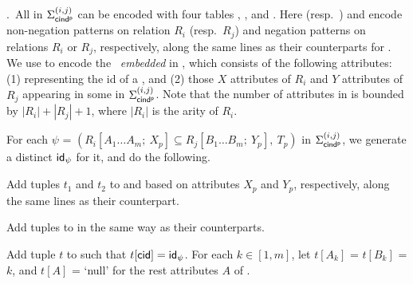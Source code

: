 .~All \pCINDs in $\Sigma_{{\mathsf{cind^p}}}^{(i,j)}$
can be encoded with four tables
\Enc{}, ,  and \Enc{\ne}.
Here  (resp.~) and \Enc{\ne} encode non-negation
patterns on relation $R_i$ (resp.~$R_j$)
and negation patterns on relations $R_i$ or $R_j$,
respectively, along the same lines as their counterparts for
\pCFDs. We use
\Enc{} to encode the \INDs\ {\em embedded} in
\pCINDs, which consists of the following attributes: (1) 
representing the id of a \pCIND,  and (2) those $X$ attributes of $R_i$
and $Y$ attributes of $R_j$ appearing in some \pCINDs in $\Sigma_{{\mathsf{cind^p}}}^{(i,j)}$.
Note that the number of attributes in \Enc{} is bounded by $|R_i| + |R_j|
+ 1$, where $|R_i|$ is the arity of $R_i$.


For each \pCIND $\psi$ = $(R_i[A_1\ldots A_m;\ X_p] \subseteq
R_j[B_1\ldots B_m;\ Y_p],\ T_p)$ in $\Sigma_{{\mathsf{cind^p}}}^{(i,j)}$, we generate a
distinct  ${\mathsf{id}}_\psi$ for it, and do the following.

\vspace{-0.5ex}\bi
\item Add tuples $t_1$ and $t_2$ to  and 
based on attributes $X_p$ and $Y_p$, respectively, along the
same lines as their \pCFD counterpart.
\item Add tuples to \Enc{\ne} in the same way as their
\pCFD counterparts.
\item Add tuple $t$ to \Enc{} such that $t[\protect\mathsf{cid}] = {\mathsf{id}}_\psi$.
For each $k\in[1, m]$,  let $t[A_k]$ = $t[B_k]$ = $k$, and $t[A]$ =
`null' for the rest attributes $A$ of \Enc{}. \ei \vspace{-1ex}

